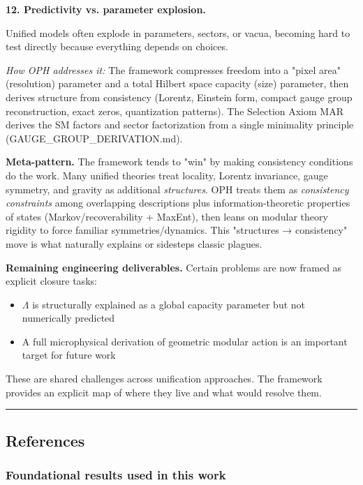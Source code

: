 \textbf{12. Predictivity vs. parameter explosion.}

Unified models often explode in parameters, sectors, or vacua, becoming hard to test directly because everything depends on choices.

\emph{How OPH addresses it:} The framework compresses freedom into a "pixel area" (resolution) parameter and a total Hilbert space capacity (size) parameter, then derives structure from consistency (Lorentz, Einstein form, compact gauge group reconstruction, exact zeros, quantization patterns). The Selection Axiom MAR derives the SM factors and sector factorization from a single minimality principle (GAUGE\_GROUP\_DERIVATION.md).

\textbf{Meta-pattern.} The framework tends to "win" by making consistency conditions do the work. Many unified theories treat locality, Lorentz invariance, gauge symmetry, and gravity as additional \emph{structures}. OPH treats them as \emph{consistency constraints} among overlapping descriptions plus information-theoretic properties of states (Markov/recoverability + MaxEnt), then leans on modular theory rigidity to force familiar symmetries/dynamics. This "structures → consistency" move is what naturally explains or sidesteps classic plagues.

\textbf{Remaining engineering deliverables.} Certain problems are now framed as explicit closure tasks:

\begin{itemize}
\tightlist
\item
  \(\Lambda\) is structurally explained as a global capacity parameter but not numerically predicted
\item
  A full microphysical derivation of geometric modular action is an important target for future work
\end{itemize}

These are shared challenges across unification approaches. The framework provides an explicit map of where they live and what would resolve them.

\begin{center}\rule{0.5\linewidth}{0.5pt}\end{center}

\subsection{References}\label{references}

\subsubsection{Foundational results used in this work}\label{foundational-results-used-in-this-work}

